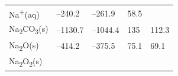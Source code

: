 \documentclass[
]{book}
\theoremstyle{definition}
\theoremstyle{definition}
\theoremstyle{definition}
\theoremstyle{remark}
\begin{document}
\begin{longtable}[]{@{}lllll@{}}
\begin{minipage}[t]{0.10\columnwidth}
Na\textsuperscript{+}(aq)\strut
\end{minipage} & \begin{minipage}[t]{0.19\columnwidth}\raggedright
--240.2\strut
\end{minipage} & \begin{minipage}[t]{0.20\columnwidth}\raggedright
--261.9\strut
\end{minipage} & \begin{minipage}[t]{0.18\columnwidth}\raggedright
58.5\strut
\end{minipage} & \begin{minipage}[t]{0.18\columnwidth}\raggedright
\strut
\end{minipage}\tabularnewline
\begin{minipage}[t]{0.10\columnwidth}\raggedright
Na\textsubscript{2}CO\textsubscript{3}(s)\strut
\end{minipage} & \begin{minipage}[t]{0.19\columnwidth}\raggedright
--1130.7\strut
\end{minipage} & \begin{minipage}[t]{0.20\columnwidth}\raggedright
--1044.4\strut
\end{minipage} & \begin{minipage}[t]{0.18\columnwidth}\raggedright
135\strut
\end{minipage} & \begin{minipage}[t]{0.18\columnwidth}\raggedright
112.3\strut
\end{minipage}\tabularnewline
\begin{minipage}[t]{0.10\columnwidth}\raggedright
Na\textsubscript{2}O(s)\strut
\end{minipage} & \begin{minipage}[t]{0.19\columnwidth}\raggedright
--414.2\strut
\end{minipage} & \begin{minipage}[t]{0.20\columnwidth}\raggedright
--375.5\strut
\end{minipage} & \begin{minipage}[t]{0.18\columnwidth}\raggedright
75.1\strut
\end{minipage} & \begin{minipage}[t]{0.18\columnwidth}\raggedright
69.1\strut
\end{minipage}\tabularnewline
\begin{minipage}[t]{0.10\columnwidth}\raggedright
Na\textsubscript{2}O\textsubscript{2}(s)\strut
\end{minipage} & \begin{minipage}[t]{0.19\columnwidth}\raggedright

\end{minipage}
\end{longtable}
\end{document}
